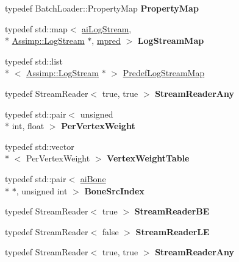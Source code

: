 \begin{DoxyCompactItemize}
\item 
\hypertarget{class_assimp_a04939c188c939262a36b887ca9578c45}{typedef Batch\+Loader\+::\+Property\+Map {\bfseries Property\+Map}}\label{class_assimp_a04939c188c939262a36b887ca9578c45}

\item 
\hypertarget{class_assimp_ad53b39f0318d9fcbe87bb54d16e562d4}{typedef std\+::map$<$ \hyperlink{structai_log_stream}{ai\+Log\+Stream}, \\*
\hyperlink{class_assimp_1_1_log_stream}{Assimp\+::\+Log\+Stream} $\ast$, \hyperlink{struct_assimp_1_1mpred}{mpred} $>$ {\bfseries Log\+Stream\+Map}}\label{class_assimp_ad53b39f0318d9fcbe87bb54d16e562d4}

\item 
typedef std\+::list\\*
$<$ \hyperlink{class_assimp_1_1_log_stream}{Assimp\+::\+Log\+Stream} $\ast$ $>$ \hyperlink{class_assimp_af711f465b88b72eeaaa5456ee8b42363}{Predef\+Log\+Stream\+Map}
\item 
\hypertarget{class_assimp_ac2bad72fb6149dc348fe268d7ef68720}{typedef Stream\+Reader$<$ true, true $>$ {\bfseries Stream\+Reader\+Any}}\label{class_assimp_ac2bad72fb6149dc348fe268d7ef68720}

\item 
\hypertarget{class_assimp_acf606e6807bd10f65f84a4051f364b07}{typedef std\+::pair$<$ unsigned \\*
int, float $>$ {\bfseries Per\+Vertex\+Weight}}\label{class_assimp_acf606e6807bd10f65f84a4051f364b07}

\item 
\hypertarget{class_assimp_afa4536a1ac0446fe1a00e4e2cec54d24}{typedef std\+::vector\\*
$<$ Per\+Vertex\+Weight $>$ {\bfseries Vertex\+Weight\+Table}}\label{class_assimp_afa4536a1ac0446fe1a00e4e2cec54d24}

\item 
\hypertarget{class_assimp_a025bf6608fe1ecb851188120c7887352}{typedef std\+::pair$<$ \hyperlink{structai_bone}{ai\+Bone} \\*
$\ast$, unsigned int $>$ {\bfseries Bone\+Src\+Index}}\label{class_assimp_a025bf6608fe1ecb851188120c7887352}

\item 
\hypertarget{class_assimp_a4dd0c532e8d93037794087c601a5f60c}{typedef Stream\+Reader$<$ true $>$ {\bfseries Stream\+Reader\+B\+E}}\label{class_assimp_a4dd0c532e8d93037794087c601a5f60c}

\item 
\hypertarget{class_assimp_ae4514023c9efb7f42eeeb18d2ce495ca}{typedef Stream\+Reader$<$ false $>$ {\bfseries Stream\+Reader\+L\+E}}\label{class_assimp_ae4514023c9efb7f42eeeb18d2ce495ca}

\item 
\hypertarget{class_assimp_ac2bad72fb6149dc348fe268d7ef68720}{typedef Stream\+Reader$<$ true, true $>$ {\bfseries Stream\+Reader\+Any}}\label{class_assimp_ac2bad72fb6149dc348fe268d7ef68720}

\end{DoxyCompactItemize}
